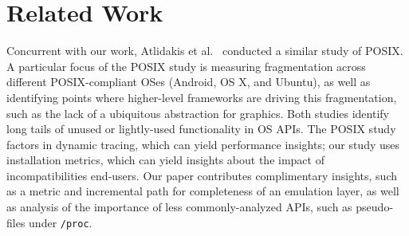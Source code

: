 \section{Related Work}
\label{sec:related}


Concurrent with our work, Atlidakis et al.~\cite{atlidakis16posix} conducted a similar 
study of POSIX.
A particular focus of the POSIX study is measuring fragmentation across different POSIX-compliant OSes
(Android, OS X, and Ubuntu), as well as identifying points where higher-level frameworks
are driving this fragmentation, such as the lack of a ubiquitous abstraction for graphics.
Both studies identify long tails of unused or lightly-used functionality in OS APIs.
The POSIX study factors in dynamic tracing, which can yield performance insights;
our study uses installation metrics, which can yield insights about the impact of incompatibilities end-users.
Our paper contributes complimentary insights, such as a metric and incremental path for 
completeness of an emulation layer, as well as analysis of the importance of less commonly-analyzed 
APIs, such as pseudo-files under {\tt /proc}.


